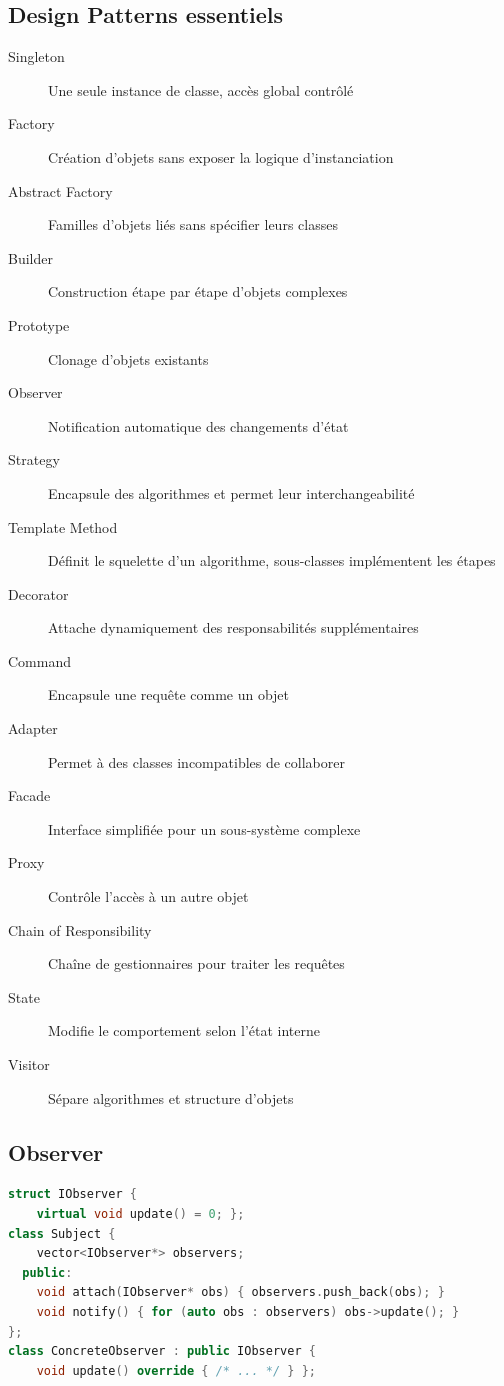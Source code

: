 \documentclass{article}
\begin{document}
\begin{multicols*}{3}
\section*{Design Patterns essentiels}
\begin{description}
\item[Singleton] Une seule instance de classe, accès global contrôlé
\item[Factory] Création d'objets sans exposer la logique d'instanciation
\item[Abstract Factory] Familles d'objets liés sans spécifier leurs classes
\item[Builder] Construction étape par étape d'objets complexes
\item[Prototype] Clonage d'objets existants
\item[Observer] Notification automatique des changements d'état
\item[Strategy] Encapsule des algorithmes et permet leur interchangeabilité
\item[Template Method] Définit le squelette d'un algorithme, sous-classes implémentent les étapes
\item[Decorator] Attache dynamiquement des responsabilités supplémentaires
\item[Command] Encapsule une requête comme un objet
\item[Adapter] Permet à des classes incompatibles de collaborer
\item[Facade] Interface simplifiée pour un sous-système complexe
\item[Proxy] Contrôle l'accès à un autre objet
\item[Chain of Responsibility] Chaîne de gestionnaires pour traiter les requêtes
\item[State] Modifie le comportement selon l'état interne
\item[Visitor] Sépare algorithmes et structure d'objets
\end{description}

\subsection*{Observer}
\begin{lstlisting}[language=C++]
struct IObserver {
    virtual void update() = 0; };
class Subject {
    vector<IObserver*> observers;
  public:
    void attach(IObserver* obs) { observers.push_back(obs); }
    void notify() { for (auto obs : observers) obs->update(); }
};
class ConcreteObserver : public IObserver {
    void update() override { /* ... */ } };
\end{lstlisting}


\end{multicols*}
\end{document}
